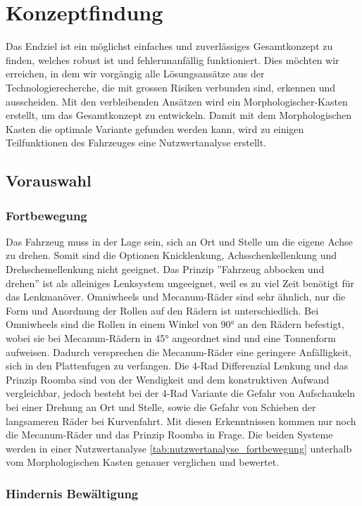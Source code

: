\documentclass[../main.tex]{subfiles}
\begin{document}
\newpage
\section{Konzeptfindung}

Das Endziel ist ein möglichst einfaches und zuverlässiges Gesamtkonzept zu finden, welches robust ist und fehlerunanfällig funktioniert. Dies möchten wir erreichen, in dem wir vorgängig alle Lösungsansätze aus der Technologierecherche, die mit grossen Risiken verbunden sind, erkennen und ausscheiden. Mit den verbleibenden Ansätzen wird ein Morphologischer-Kasten erstellt, um das Gesamtkonzept zu entwickeln. Damit mit dem Morphologischen Kasten die optimale Variante gefunden werden kann, wird zu einigen Teilfunktionen des Fahrzeuges eine Nutzwertanalyse erstellt.

\subsection{Vorauswahl}
    \subsubsection{Fortbewegung}
    Das Fahrzeug muss in der Lage sein, sich an Ort und Stelle um die eigene Achse zu drehen. Somit sind die Optionen Knicklenkung, Achsschenkellenkung und Drehschemellenkung nicht geeignet.
    Das Prinzip ''Fahrzeug abbocken und drehen'' ist als alleiniges Lenksystem ungeeignet, weil es zu viel Zeit benötigt für das Lenkmanöver. 
    Omniwheels und Mecanum-Räder sind sehr ähnlich, nur die Form und Anordnung der Rollen auf den Rädern ist unterschiedlich. Bei Omniwheels sind die Rollen in einem Winkel von 90° an den Rädern befestigt, wobei sie bei Mecanum-Rädern in 45° angeordnet sind und eine Tonnenform aufweisen. Dadurch versprechen die Mecanum-Räder eine geringere Anfälligkeit, sich in den Plattenfugen zu verfangen. Die 4-Rad Differenzial Lenkung und das Prinzip Roomba sind von der Wendigkeit und dem konstruktiven Aufwand vergleichbar, jedoch besteht bei der 4-Rad Variante die Gefahr von Aufschaukeln bei einer Drehung an Ort und Stelle, sowie die Gefahr von Schieben der langsameren Räder bei Kurvenfahrt. Mit diesen Erkenntnissen kommen nur noch die Mecanum-Räder und das Prinzip Roomba in Frage. Die beiden Systeme werden in einer Nutzwertanalyse \ref{tab:nutzwertanalyse_fortbewegung} unterhalb vom Morphologischen Kasten genauer verglichen und bewertet.
        
\newpage
\subsubsection{Hindernis Bewältigung}
\end{document}
